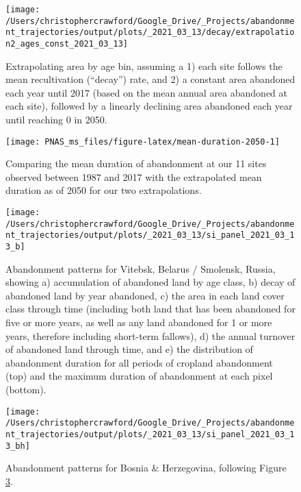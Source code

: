 \documentclass[9pt,twocolumn,twoside,lineno]{pnas-new}
\begin{document}
\begin{figure}
\texttt{[image: /Users/christophercrawford/Google\_Drive/\_Projects/abandonment\_trajectories/output/plots/\_2021\_03\_13/decay/extrapolation2\_ages\_const\_2021\_03\_13]} \caption{Extrapolating area by age bin, assuming a 1) each site follows the mean recultivation (``decay'') rate, and 2) a constant area abandoned each year until 2017 (based on the mean annual area abandoned at each site), followed by a linearly declining area abandoned each year until reaching 0 in 2050.}\label{fig:extrapolation2-area-by-age}
\end{figure}



\begin{figure}
\texttt{[image: PNAS\_ms\_files/figure-latex/mean-duration-2050-1]} \caption{Comparing the mean duration of abandonment at our 11 sites observed between 1987 and 2017 with the extrapolated mean duration as of 2050 for our two extrapolations.}\label{fig:mean-duration-2050}
\end{figure}














\begin{figure}
\texttt{[image: /Users/christophercrawford/Google\_Drive/\_Projects/abandonment\_trajectories/output/plots/\_2021\_03\_13/si\_panel\_2021\_03\_13\_b]} \caption{Abandonment patterns for Vitebsk, Belarus / Smolensk, Russia, showing a) accumulation of abandoned land by age class, b) decay of abandoned land by year abandoned, c) the area in each land cover class through time (including both land that has been abandoned for five or more years, as well as any land abandoned for 1 or more years, therefore including short-term fallows), d) the annual turnover of abandoned land through time, and e) the distribution of abandonment duration for all periods of cropland abandonment (top) and the maximum duration of abandonment at each pixel (bottom).}\label{fig:panel-b}
\end{figure}

\begin{figure}
\texttt{[image: /Users/christophercrawford/Google\_Drive/\_Projects/abandonment\_trajectories/output/plots/\_2021\_03\_13/si\_panel\_2021\_03\_13\_bh]} \caption{Abandonment patterns for Bosnia \& Herzegovina, following Figure \ref{fig:panel-b}.}\label{fig:panel-bh}
\end{figure}
\end{document}
